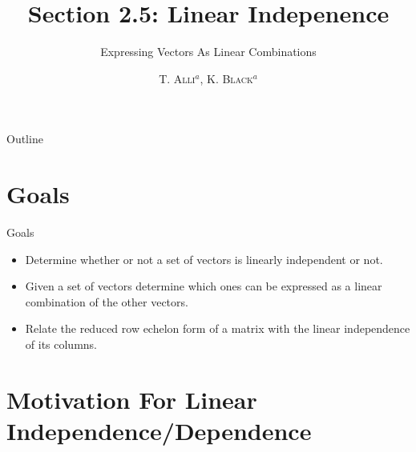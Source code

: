 \documentclass[svgnames,table,,aspectratio=169]{beamer}
\begin{document}
\author{\textsc{T. Alli$^{a}$, K. Black$^{a}$}}
\subject{Linear Algebra}


\title{Section 2.5: Linear Indepenence}
\subtitle{Expressing Vectors As Linear Combinations}


\date{} %

\begin{frame}
  \titlepage
\end{frame}

\begin{frame}{Outline}
  \tableofcontents
\end{frame}


\section{Goals}

\begin{frame}{Goals}

  \begin{itemize}
  \item Determine whether or not a set of vectors is linearly
    independent or not.
  \item Given a set of vectors determine which ones can be expressed
    as a linear combination of the other vectors.
  \item Relate the reduced row echelon form of a matrix with the
    linear independence of its columns.
  \end{itemize}

\end{frame}

\section{Motivation For Linear Independence/Dependence}
\end{document}
